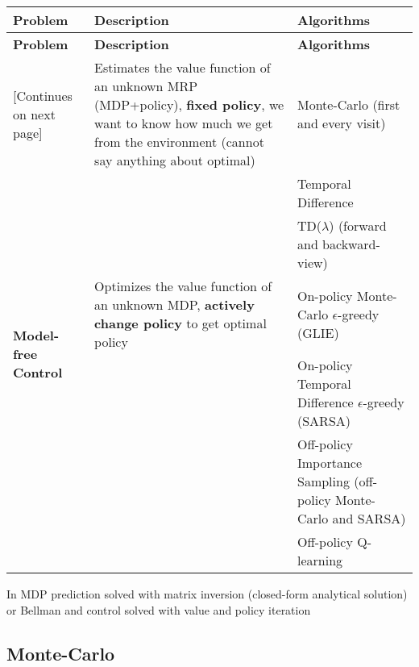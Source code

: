 \begin{tabularx}{\linewidth}{X X X}
    \toprule
    \textbf{Problem} & \textbf{Description} & \textbf{Algorithms}\\
    \midrule
    \endfirsthead
    \toprule
    \textbf{Problem} & \textbf{Description} & \textbf{Algorithms}\\
    \midrule
    \endhead
    \midrule
    \footnotesize [Continues on next page]
    \endfoot
    \bottomrule
    \endlastfoot
    \multirow{3}{*}{\textbf{Model-free Prediction}} & Estimates the value function of an unknown MRP (MDP+policy), \textbf{fixed policy}, we want to know how much we get from the environment (cannot say anything about optimal)& Monte-Carlo (first and every visit) \\ \cmidrule{3-3}
    & & Temporal Difference \\ \cmidrule{3-3}
    & & TD($\lambda$) (forward and backward-view)\\ \midrule
    \multirow{2}{*}{\textbf{Model-free Control}} & Optimizes the value function of an unknown MDP, \textbf{actively change policy} to get optimal policy & On-policy Monte-Carlo $\epsilon$-greedy (GLIE) \\ \cmidrule{3-3}
    & & On-policy Temporal Difference $\epsilon$-greedy (SARSA) \\ \cmidrule{3-3}
    & & Off-policy Importance Sampling (off-policy Monte-Carlo and SARSA) \\ \cmidrule{3-3}
    & & Off-policy Q-learning
\end{tabularx}
    In MDP prediction solved with matrix inversion (closed-form analytical solution) or Bellman and control solved with value and policy iteration

\subsection{Monte-Carlo}
